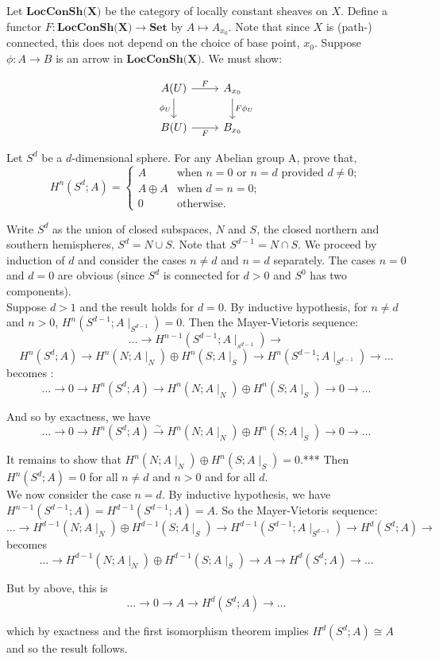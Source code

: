 Let $\textbf{LocConSh(X)}$ be the category of locally constant sheaves on $X$. Define a functor $F: \textbf{LocConSh(X)} \rightarrow \textbf{Set}$ by $A \mapsto A_{x_0}$. Note that since $X$ is (path-) connected, this does not depend on the choice of base point, $x_0$. Suppose $\phi:A \rightarrow B$ is an arrow in $\textbf{LocConSh(X)}$. We must show:

\[
\begin{tikzcd}
A(U) \arrow[r, "F"] \arrow[d, "\phi_U"']
&  A_{x_0} \arrow[d, "F\phi_U"] \\
B(U) \arrow[r, "F"']
& B_{x_0} 
\end{tikzcd}
\]

 Let $S^d$ be a $d$-dimensional sphere. For any Abelian group A, prove that,
\[H^n(S^d;A) = \begin{cases}
A & \text{when } n=0 \text{ or } n =d \text{ provided } d \neq 0;\\
A \oplus A & \text{when } d=n=0;\\
0 & \text{otherwise}.
\end{cases}\]

Write $S^d$ as the union of closed subspaces, $N$ and $S$, the closed northern and southern hemispheres, $S^d=N \cup S$. Note that $S^{d-1} = N \cap S$. We proceed by induction of $d$ and consider the cases $n \neq d$ and $n = d$ separately. The cases $n=0$ and $d=0$ are obvious (since $S^d$ is connected for $d>0$ and $S^0$ has two components).\\

Suppose $d >1$ and the result holds for $d=0$. By inductive hypothesis, for $n \neq d$ and $n>0$, $H^n(S^{d-1};A\mid_{S^{d-1}}) =0.$ Then the Mayer-Vietoris sequence:
\[\ldots \rightarrow H^{n-1}(S^{d-1}; A\mid_{s^{d-1}}) \rightarrow\]\[  H^n(S^d;A) \rightarrow H^n(N;A\mid_N) \oplus H^n(S;A\mid_S) \rightarrow H^n(S^{d-1}; A\mid_{S^{d-1}}) \rightarrow \ldots \]
becomes :
\[ \ldots \rightarrow 0 \rightarrow H^n(S^d;A) \rightarrow H^n(N;A\mid_N) \oplus H^n(S;A\mid_S) \rightarrow 0 \rightarrow \ldots \]

And so by exactness, we have 
\[ \ldots \rightarrow 0 \rightarrow H^n(S^d;A) \xrightarrow{\sim} H^n(N;A\mid_N) \oplus H^n(S;A\mid_S) \rightarrow 0 \rightarrow \ldots \]

It remains to show that $H^n(N;A\mid_N) \oplus H^n(S;A\mid_S) =0$.*** Then $H^n(S^d;A)=0$ for all $n \neq d$ and $n >0$ and for all $d$.\\

We now consider the case $n =d$. By inductive hypothesis, we have $H^{n-1}(S^{d-1};A)=H^{d-1}(S^{d-1};A) =A.$ So the Mayer-Vietoris sequence:
\[\ldots \rightarrow H^{d-1}(N;A\mid_N) \oplus H^{d-1}(S;A\mid_S) \rightarrow H^{d-1}(S^{d-1}; A\mid_{S^{d-1}}) \rightarrow H^d(S^d;A) \rightarrow\]
becomes
\[\ldots  \rightarrow H^{d-1}(N;A\mid_N) \oplus H^{d-1}(S;A\mid_S) \rightarrow A \rightarrow H^d(S^d;A) \rightarrow \ldots\]

But by above, this is 
\[\ldots  \rightarrow 0\rightarrow A \rightarrow H^d(S^d;A) \rightarrow \ldots\]

which by exactness and the first isomorphism theorem implies $H^d(S^d;A) \cong A$ and so the result follows.

 
